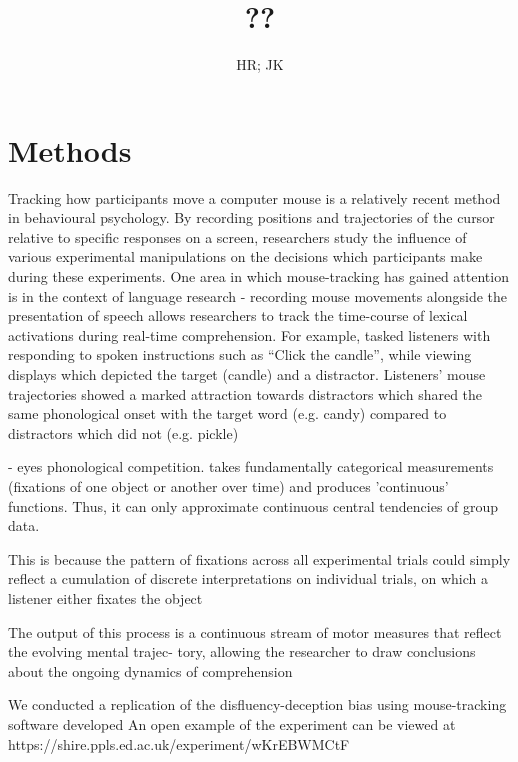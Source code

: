 \documentclass[a4paper,man,natbib]{apa6}
\title{??}
\author{HR; JK}
\affiliation{}
\newcommand*{\spex}[1]{``{#1}''} %
\begin{document}
\maketitle
\linenumbers
\noindent



\section*{Methods}
Tracking how participants move a computer mouse is a relatively recent method in behavioural psychology. 
By recording positions and trajectories of the cursor relative to specific responses on a screen, researchers study the influence of various experimental manipulations on the decisions which participants make during these experiments.
One area in which mouse-tracking has gained attention is in the context of language research - recording mouse movements alongside the presentation of speech allows researchers to track the time-course of lexical activations during real-time comprehension.
For example, \citet{Spivey?} tasked listeners with responding to spoken instructions such as \spex{Click the
candle}, while viewing displays which depicted the target (candle) and a distractor. 
Listeners’ mouse trajectories showed a marked attraction towards distractors which
shared the same phonological onset with the target word (e.g. candy) compared to
distractors which did not (e.g. pickle)

\citet{Allopenna1998} - eyes phonological competition. 
takes fundamentally categorical measurements (fixations of one object or another over time) and produces 'continuous' functions. Thus, it can only approximate continuous central tendencies of group data.

This is because the pattern of fixations across all experimental trials
could simply reflect a cumulation of discrete interpretations on individual trials,
on which a listener either fixates the object
\citep{Farmer2005}

The output of this process is
a continuous stream of motor measures that reflect the evolving mental trajec-
tory, allowing the researcher to draw conclusions about the ongoing dynamics of
comprehension


We conducted a replication of the disfluency-deception bias \citep[see]{Loy2017} using mouse-tracking software developed %
An open example of the experiment can be viewed at https://shire.ppls.ed.ac.uk/experiment/wKrEBWMCtF
\end{document}
